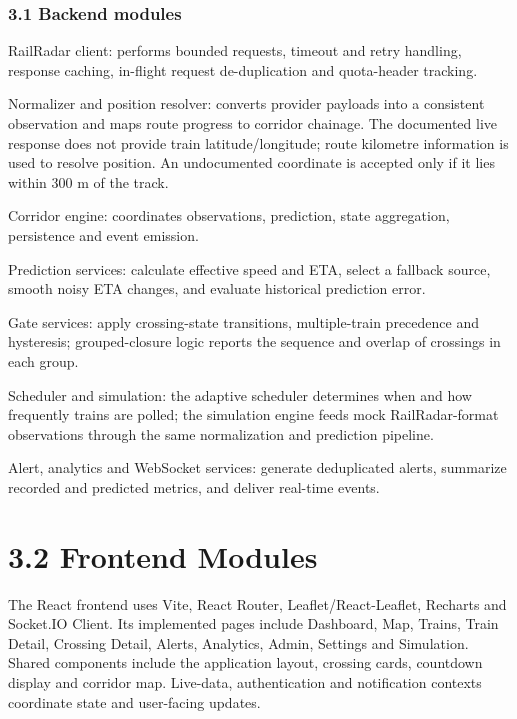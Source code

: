 \documentclass[12pt,a4paper]{report}
\begin{document}
\subsection{3.1 Backend modules}
RailRadar client: performs bounded requests, timeout and retry handling, response caching, in-flight request de-duplication and quota-header tracking.

Normalizer and position resolver: converts provider payloads into a consistent observation and maps route progress to corridor chainage. The documented live response does not provide train latitude/longitude; route kilometre information is used to resolve position. An undocumented coordinate is accepted only if it lies within 300 m of the track.

Corridor engine: coordinates observations, prediction, state aggregation, persistence and event emission.

Prediction services: calculate effective speed and ETA, select a fallback source, smooth noisy ETA changes, and evaluate historical prediction error.

Gate services: apply crossing-state transitions, multiple-train precedence and hysteresis; grouped-closure logic reports the sequence and overlap of crossings in each group.

Scheduler and simulation: the adaptive scheduler determines when and how frequently trains are polled; the simulation engine feeds mock RailRadar-format observations through the same normalization and prediction pipeline.

Alert, analytics and WebSocket services: generate deduplicated alerts, summarize recorded and predicted metrics, and deliver real-time events.

\chapter{3.2 Frontend Modules}
The React frontend uses Vite, React Router, Leaflet/React-Leaflet, Recharts and Socket.IO Client. Its implemented pages include Dashboard, Map, Trains, Train Detail, Crossing Detail, Alerts, Analytics, Admin, Settings and Simulation. Shared components include the application layout, crossing cards, countdown display and corridor map. Live-data, authentication and notification contexts coordinate state and user-facing updates.
\end{document}
